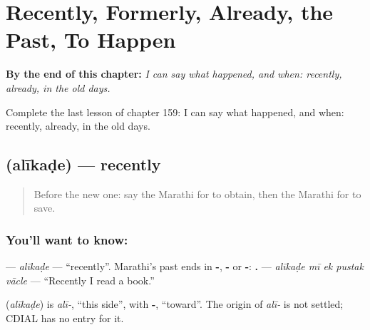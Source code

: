 
\chapter{Recently, Formerly, Already, the Past, To Happen}
\label{ch:mr-recently-formerly-already-the-past-to-happen}

\begin{chapteropening}
\textbf{By the end of this chapter:} \emph{I can say what happened, and when: recently, already, in the old days.}

Complete the last lesson of chapter 159: I can say what happened, and when: recently, already, in the old days.
\end{chapteropening}

\section[\texorpdfstring{\mr{अलीकडे} (alīkaḍe)}{अलीकडे (alīkaḍe)}]{ (alīkaḍe) — recently}

\label{lesson:MR-C159-alikade}



\begin{quote}
Before the new one: say the Marathi for to obtain, then the Marathi for to save.
\end{quote}

\subsection*{You'll want to know: }
\textbf{} — \emph{alīkaḍe} — \textquotedblleft{}recently\textquotedblright{}. Marathi's past ends in \textbf{-}, \textbf{-} or \textbf{-}: \textbf{    .} — \emph{alīkaḍe mī ek pustak vācle} — \textquotedblleft{}Recently I read a book.\textquotedblright{}

\begin{cousinweb}
\textbf{} (\emph{alīkaḍe}) is \emph{alī-}, \textquotedblleft{}this side\textquotedblright{}, with \textbf{-}, \textquotedblleft{}toward\textquotedblright{}. The origin of \emph{alī-} is not settled; CDIAL has no entry for it.
\end{cousinweb}


